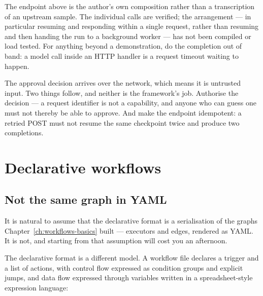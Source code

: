 \begin{verifybox}
The endpoint above is the author's own composition rather than a transcription of
an upstream sample. The individual calls are verified; the arrangement --- in
particular resuming and responding within a single request, rather than resuming
and then handing the run to a background worker --- has not been compiled or load
tested. For anything beyond a demonstration, do the completion out of band: a
model call inside an HTTP handler is a request timeout waiting to happen.
\end{verifybox}

\begin{warning}
The approval decision arrives over the network, which means it is untrusted
input. Two things follow, and neither is the framework's job. Authorise the
decision --- a request identifier is not a capability, and anyone who can guess
one must not thereby be able to approve. And make the endpoint idempotent: a
retried POST must not resume the same checkpoint twice and produce two
completions.
\end{warning}

\section{Declarative workflows}
\label{sec:dur-declarative}

\subsection{Not the same graph in YAML}

It is natural to assume that the declarative format is a serialisation of the
graphs Chapter~\ref{ch:workflows-basics} built --- executors and edges, rendered
as YAML. It is not, and starting from that assumption will cost you an afternoon.

The declarative format is a different model. A workflow file declares a trigger
and a list of actions, with control flow expressed as condition groups and
explicit jumps, and data flow expressed through variables written in a
spreadsheet-style expression language:

